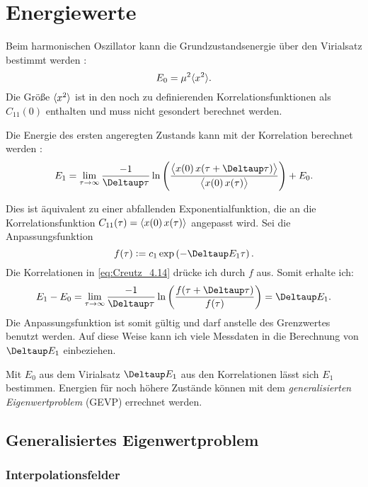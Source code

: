 \chapter{Energiewerte}

Beim harmonischen Oszillator kann die Grundzustandsenergie über den Virialsatz
bestimmt werden \parencite[(4.13)]{Creutz/Statistical_Approach_QM}:
\[
    E_0 = \mu^2 \langle x^2 \rangle.
\]
Die Größe $\langle x^2 \rangle$ ist in den noch zu definierenden
Korrelationsfunktionen als $C_{11}(0)$ enthalten und muss nicht gesondert
berechnet werden.

Die Energie des ersten angeregten Zustands kann mit der Korrelation
berechnet werden \parencite[(4.14)]{Creutz/Statistical_Approach_QM}:
\begin{equation}
    \label{eq:Creutz_4.14}
    E_1 = \lim_{\tau \to \infty} \frac{-1}{\Deltaup \tau} \ln
    \del{\frac{\Bracket{x(0) \, x(\tau + \Deltaup \tau)}}{\Bracket{x(0) \,
    x(\tau)}}} + E_0.
\end{equation}

Dies ist äquivalent zu einer abfallenden Exponentialfunktion, die an die
Korrelationsfunktion $C_{11}(\tau) = \langle x(0) \, x(\tau) \rangle$ angepasst wird.
Sei die Anpassungsfunktion
\begin{equation}
    \label{eq:fit-function-time-evolution}
    f(\tau) := c_1 \exp\del{-\Deltaup E_1 \tau}.
\end{equation}
Die Korrelationen in \eqref{eq:Creutz_4.14} drücke ich durch $f$ aus. Somit
erhalte ich:
\[
    E_1 - E_0
    = \lim_{\tau \to \infty} \frac{-1}{\Deltaup \tau} \ln
    \del{\frac{f(\tau + \Deltaup \tau)}{f(\tau)}}
    = \Deltaup E_1.
\]
Die Anpassungsfunktion ist somit gültig und darf anstelle des Grenzwertes
benutzt werden. Auf diese Weise kann ich viele Messdaten in die Berechnung von
$\Deltaup E_1$ einbeziehen.

Mit $E_0$ aus dem Virialsatz $\Deltaup E_1$ aus den Korrelationen lässt sich
$E_1$ bestimmen. Energien für noch höhere Zustände können mit dem
\emph{generalisierten Eigenwertproblem} (GEVP) errechnet werden.

\section{Generalisiertes Eigenwertproblem}

\subsection{Interpolationsfelder}


